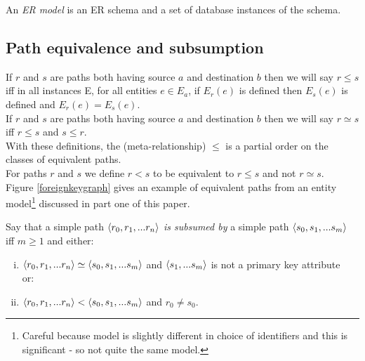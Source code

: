 \documentclass[10pt,a4paper]{article}
\newcommand{\term}[1]{\textit{{#1}}}
\begin{document}
\begin{definition}
\noindent An \term{ER model} is an ER schema and a set of database instances of the schema. \\
\end{definition}



\subsection{Path equivalence and subsumption}

\noindent If $r$ and $s$ are paths both having source $a$ and destination $b$ then we will say $r \leq s$ iff in all instances E, for all 
entities $e \in E_a$, if $E_r(e)$ is defined then $E_s(e)$ is defined and $E_r(e)=E_s(e)$. \\

\noindent If $r$ and $s$ are paths both having source $a$ and destination $b$ then we will say $r \simeq s$ iff $r \leq s$ and $s \leq r$. \\

\noindent With these definitions,  the (meta-relationship) $\leq$ is a partial order on the classes of equivalent paths. \\

\noindent For paths $r$ and $s$ we define $r < s$ to be equivalent to $r \leq s$ and not $r \simeq s$. \\

\noindent Figure \ref{foreignkeygraph} gives an example of equivalent paths from an entity model\footnote{Careful because model is slightly different in choice of identifiers and this is significant - so not quite the same model.} discussed in part one of this paper.


\begin{definition}
Say that a simple path $\langle r_0,r_1,...r_n\rangle$ \textit{is subsumed by} a simple path 
$\langle s_0,s_1,...s_m\rangle$ iff $m \geq 1$ and either:
\begin{enumerate} [(i)]

\item $\langle r_0,r_1,...r_n\rangle \simeq  \langle s_0,s_1,...s_m\rangle$ and 
$\langle s_1,...s_m\rangle$ is not a primary key attribute\\

 \hspace{1cm} or:
\item $\langle r_0,r_1,...r_n\rangle <  \langle s_0,s_1,...s_m\rangle$ and $r_0 \neq s_0$.
\end{enumerate}
\end{definition}
\end{document}
